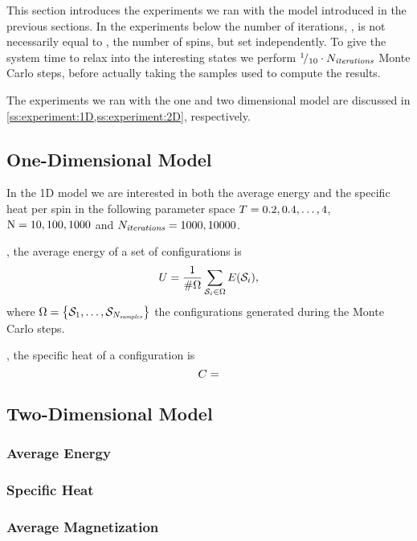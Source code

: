 This section introduces the experiments we ran with the model introduced in the previous sections. In the experiments below the number of iterations, \numberOfIterations, is not necessarily equal to \numberOfSpins, the number of spins, but set independently. To give the system time to relax into the interesting states we perform \mbox{${}^{1}\!/_{10} \cdot N_\textit{iterations}$} Monte Carlo steps, before actually taking the samples used to compute the results. 

 The experiments we ran with the one and two dimensional model are discussed in \cref{ss:experiment:1D,ss:experiment:2D}, respectively.

\subsection{One-Dimensional Model}
\label{ss:experiment:1D}
	In the 1D model we are interested in both the average energy and the specific heat per spin in the following parameter space \mbox{$T = 0.2, 0.4, \dotsc, 4$}, \mbox{$\mathrm{N}=10,100,1000$} and \mbox{$N_\textit{iterations}=1000,10000$}. 

	\averageEnergy, the average energy of a set of configurations is
	\begin{equation*}
		U = \frac{1}{\#\Omega} \sum_{\mathcal{S}_{i} \in \Omega} E(\mathcal{S}_{i}),
	\end{equation*}
	where $\Omega = \left\{ \mathcal{S}_{1}, \dotsc, \mathcal{S}_{N_\textit{samples}} \right\}$ the configurations generated during the Monte Carlo steps.

	\specificHeat, the specific heat of a configuration is
	\begin{equation*}
		C = 
	\end{equation*}


\subsection{Two-Dimensional Model}
\label{ss:experiment:2D}

	\subsubsection*{Average Energy}


	\subsubsection*{Specific Heat}

	\subsubsection*{Average Magnetization}

